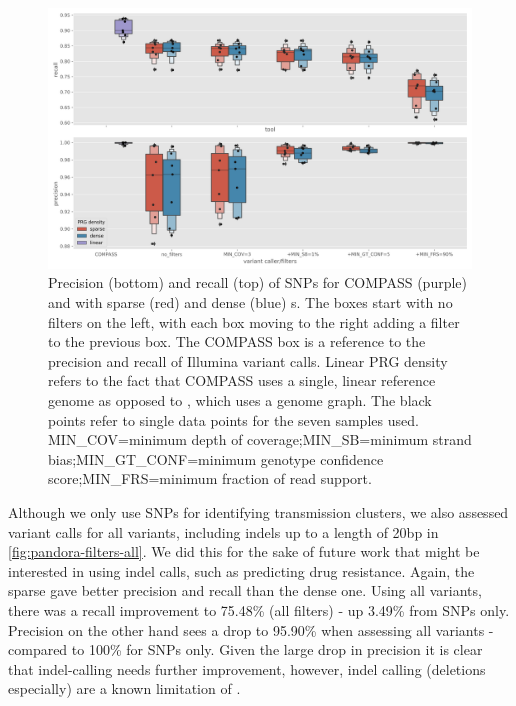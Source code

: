\begin{figure}
\begin{center}
\includegraphics[width=0.90\columnwidth]{Chapter2/Figs/pandora-precision-recall-filters-snps.png}
\caption{{Precision (bottom) and recall (top) of SNPs for COMPASS (purple) and \pandora{} with sparse (red) and dense (blue) \prg{}s. The \pandora{} boxes start with no filters on the left, with each box moving to the right adding a filter to the previous box. The COMPASS box is a reference to the precision and recall of Illumina variant calls. Linear PRG density refers to the fact that COMPASS uses a single, linear reference genome as opposed to \pandora{}, which uses a genome graph. The black points refer to single data points for the seven samples used. MIN\_COV=minimum depth of coverage;MIN\_SB=minimum strand bias;MIN\_GT\_CONF=minimum genotype confidence score;MIN\_FRS=minimum fraction of read support.
{\label{fig:pandora-filters-snps}}%
}}
\end{center}
\end{figure}


Although we only use SNPs for identifying transmission clusters, we also assessed \pandora{} variant calls for all variants, including indels up to a length of 20bp in \autoref{fig:pandora-filters-all}.  We did this for the sake of future work that might be interested in using \pandora{} indel calls, such as predicting drug resistance. Again, the sparse \prg{} gave better precision and recall than the dense one. Using all variants, there was a recall improvement to 75.48\% (all filters) - up 3.49\% from SNPs only. Precision on the other hand sees a drop to 95.90\% when assessing all variants - compared to 100\% for SNPs only. Given the large drop in precision it is clear that \pandora{} indel-calling needs further improvement, however, indel calling (deletions especially) are a known limitation of \ont{} \cite{jain2018,wick2019}.

